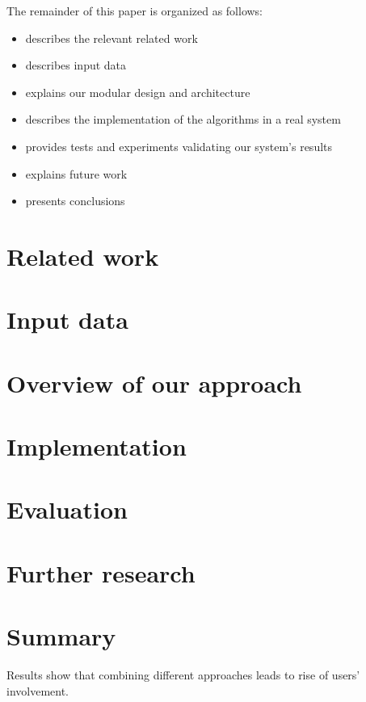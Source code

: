 \documentclass{article}
\begin{document}
        The remainder of this paper is organized as follows:
        
            \begin{itemize}
                \item {} describes the relevant related work
                \item {} describes input data
                \item {} explains our modular design and architecture
                \item {} describes the implementation of the algorithms in a real system
                \item {} provides tests and experiments validating
our system’s results
                \item {} explains future work
                \item {} presents conclusions
            \end{itemize}

    \section{Related work}
    \label{sec:related}


    \section{Input data}
    \label{sec:input}

    \section{Overview of our approach}
    \label{sec:overview}

    \section{Implementation}
    \label{sec:implementation}

    \section{Evaluation}
    \label{sec:evaluation}

    \section{Further research}
    \label{sec:further}

    \section{Summary}
    \label{sec:summary}

        Results show that combining different approaches leads to rise of users' involvement.

        

    
      
\end{document}
